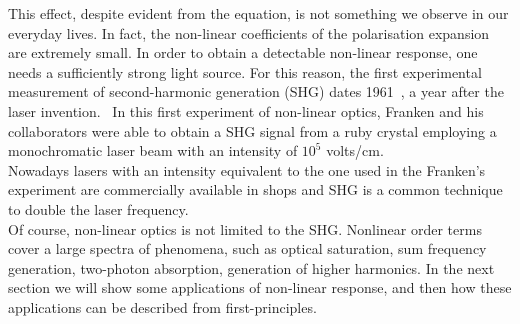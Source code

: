 This effect, despite evident from the equation, is not something we observe in our everyday lives. In fact, the non-linear coefficients of the polarisation expansion are extremely small. In order to obtain a detectable non-linear response, one needs a sufficiently strong light source. For this reason, the first experimental measurement of second-harmonic generation (SHG) dates 1961~\cite{franken1961generation}, a year after the laser invention.~\cite{maiman1960stimulated} In this first experiment of non-linear optics, Franken and his collaborators were able to obtain a SHG signal from a ruby crystal employing a monochromatic laser beam with an intensity of $10^5$ volts/cm.\\ %
Nowadays lasers with an intensity equivalent to the one used in the Franken's experiment are commercially available in shops and SHG is a common technique to double the laser frequency.\\
Of course, non-linear optics is not limited to the SHG. Nonlinear order terms cover a large spectra of phenomena, such as optical saturation, sum frequency generation, two-photon absorption, generation of higher harmonics. In the next section we will show some applications of non-linear response, and then how these applications can be described from first-principles.

